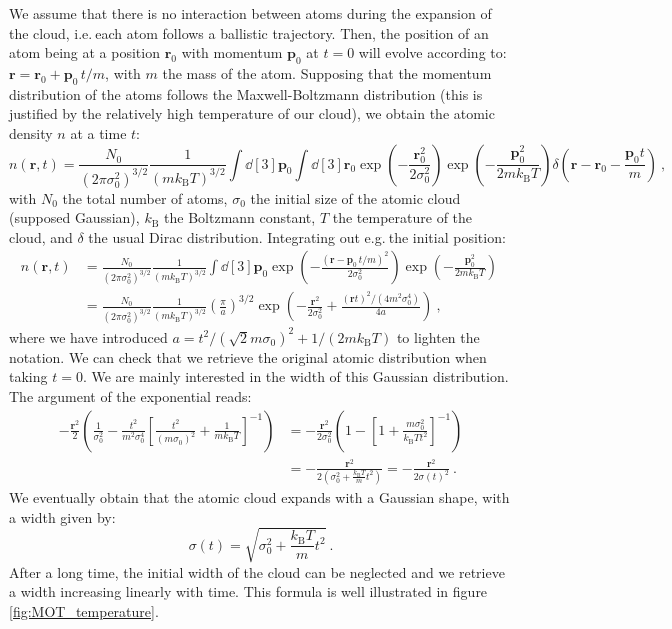 \documentclass[11pt]{article}
\newcommand{\mathsc}[1]{\mathrm{\scriptscriptstyle {#1}}}
\numberwithin{equation}{section}
\numberwithin{figure}{section}
\begin{document}
We assume that there is no interaction between atoms during the expansion of the cloud, i.e.$~$each atom follows a ballistic trajectory. Then, the position of an atom being at a position $\mathbf{r}_0$ with momentum $\mathbf{p}_0$ at $t=0$ will evolve according to: $\mathbf{r} = \mathbf{r}_0 + \mathbf{p}_0 \, t /m$, with $m$ the mass of the atom. Supposing that the momentum distribution of the atoms follows the Maxwell-Boltzmann distribution (this is justified by the relatively high temperature of our cloud), we obtain the atomic density $n$ at a time $t$:
%
\begin{equation}
	n(\mathbf{r}, t) = \frac{N_0}{(2 \pi \sigma_0^2)^{3/2}} \frac{1}{(m k_\mathsc{B} T)^{3/2}} \int \dd[3]{\mathbf{p}_0} \int \dd[3]{\mathbf{r}_0} \exp(- \frac{\mathbf{r}_0^2}{2 \sigma_0^2}) \exp(- \frac{\mathbf{p}_0^2}{2 m k_\mathsc{B}T}) \delta \left( \mathbf{r} - \mathbf{r}_0 - \frac{\mathbf{p}_0 t}{m}\right)~,
\end{equation}
%
with $N_0$ the total number of atoms, $\sigma_0$ the initial size of the atomic cloud (supposed Gaussian), $k_\mathsc{B}$ the Boltzmann constant, $T$ the temperature of the cloud, and $\delta$ the usual Dirac distribution. Integrating out e.g.$~$the initial position:
%
\begin{align}
	n(\mathbf{r}, t) &= \frac{N_0}{(2 \pi \sigma_0^2)^{3/2}} \frac{1}{(m k_\mathsc{B} T)^{3/2}} \int \dd[3]{\mathbf{p}_0} \exp(- \frac{(\mathbf{r} - \mathbf{p}_0 \, t /m )^2}{2 \sigma_0^2}) \exp(- \frac{\mathbf{p}_0^2}{2 m k_\mathsc{B}T}) ~\\
									 & = \frac{N_0}{(2 \pi \sigma_0^2)^{3/2}} \frac{1}{(m k_\mathsc{B} T)^{3/2}} \left( \frac{\pi}{a}\right)^{3/2} \exp(-\frac{\mathbf{r}^2}{2 \sigma_0^2}+\frac{(\mathbf{r} t)^2/ (4 m^2 \sigma_0^4)}{4 a})~,
\end{align}
%
where we have introduced $a = t^2/  (\sqrt{2} m \sigma_0)^2 + 1/ (2 m k_\mathsc{B}T)$ to lighten the notation. We can check that we retrieve the original atomic distribution when taking $t=0$. We are mainly interested in the width of this Gaussian distribution. The argument of the exponential reads:
%
\begin{align}
 - \frac{\mathbf{r}^2}{2} \left( \frac{1}{\sigma_0^2} - \frac{t^2}{m^2 \sigma_0^4} \left[  \frac{t^2}{(m \sigma_0)^2} + \frac{1}{ m k_\mathsc{B}T} \right]^{-1} \right)
 										 &=- \frac{\mathbf{r}^2}{2 \sigma_0^2} \left( 1 - \left[ 1+ \frac{ m \sigma_0^2}{k_\mathsc{B} T t^2} \right]^{-1} \right) \\
 										 &= -\frac{\mathbf{r}^2}{2 \left(\sigma_0^2 + \frac{k_\mathsc{B} T}{m} t^2 \right)} = - \frac{\mathbf{r}^2}{2 \sigma(t)^2} ~.
\end{align}
%
We eventually obtain that the atomic cloud expands with a Gaussian shape, with a width given by:
%
\begin{equation}
	\label{eq:width_tof}
	\sigma(t) = \sqrt{\sigma_0^2 + \frac{k_\mathsc{B} T}{m} t^2}~.
\end{equation}
%
After a long time, the initial width of the cloud can be neglected and we retrieve a width increasing linearly with time. This formula is well illustrated in figure \ref{fig:MOT_temperature}.
\end{document}
